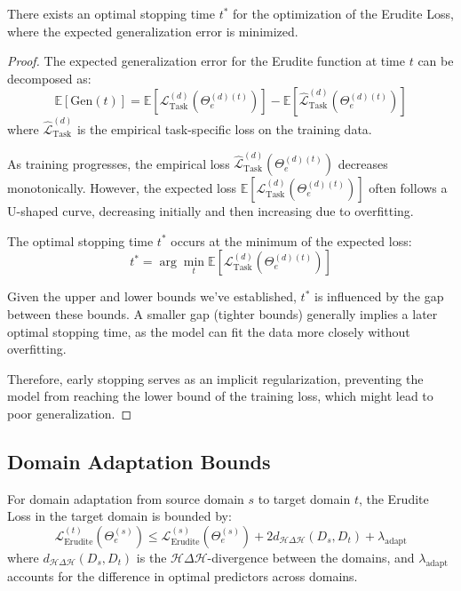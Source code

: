 \begin{theorem}
There exists an optimal stopping time $t^*$ for the optimization of the Erudite Loss, where the expected generalization error is minimized.
\end{theorem}

\begin{proof}
The expected generalization error for the Erudite function at time $t$ can be decomposed as:
\begin{equation}
\mathbb{E}[\text{Gen}(t)] = \mathbb{E}[\mathcal{L}_{\text{Task}}^{(d)}(\Theta_e^{(d)(t)})] - \mathbb{E}[\hat{\mathcal{L}}_{\text{Task}}^{(d)}(\Theta_e^{(d)(t)})]
\end{equation}
where $\hat{\mathcal{L}}_{\text{Task}}^{(d)}$ is the empirical task-specific loss on the training data.

As training progresses, the empirical loss $\hat{\mathcal{L}}_{\text{Task}}^{(d)}(\Theta_e^{(d)(t)})$ decreases monotonically. However, the expected loss $\mathbb{E}[\mathcal{L}_{\text{Task}}^{(d)}(\Theta_e^{(d)(t)})]$ often follows a U-shaped curve, decreasing initially and then increasing due to overfitting.

The optimal stopping time $t^*$ occurs at the minimum of the expected loss:
\begin{equation}
t^* = \arg\min_t \mathbb{E}[\mathcal{L}_{\text{Task}}^{(d)}(\Theta_e^{(d)(t)})]
\end{equation}

Given the upper and lower bounds we've established, $t^*$ is influenced by the gap between these bounds. A smaller gap (tighter bounds) generally implies a later optimal stopping time, as the model can fit the data more closely without overfitting.

Therefore, early stopping serves as an implicit regularization, preventing the model from reaching the lower bound of the training loss, which might lead to poor generalization.
\end{proof}

\subsection{Domain Adaptation Bounds}

\begin{theorem}
For domain adaptation from source domain $s$ to target domain $t$, the Erudite Loss in the target domain is bounded by:
\begin{equation}
\mathcal{L}_{\text{Erudite}}^{(t)}(\Theta_e^{(s)}) \leq \mathcal{L}_{\text{Erudite}}^{(s)}(\Theta_e^{(s)}) + 2d_{\mathcal{H}\Delta\mathcal{H}}(D_s, D_t) + \lambda_{\text{adapt}}
\end{equation}
where $d_{\mathcal{H}\Delta\mathcal{H}}(D_s, D_t)$ is the $\mathcal{H}\Delta\mathcal{H}$-divergence between the domains, and $\lambda_{\text{adapt}}$ accounts for the difference in optimal predictors across domains.
\end{theorem}

